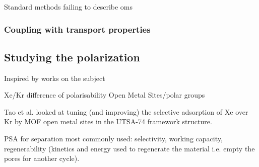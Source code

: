\documentclass[main]{subfiles}
\begin{document}
Standard methods failing to describe oms\autocite{Perry_2014} 


\subsubsection{Coupling with transport properties}


\subsection{Studying the polarization}

Inspired by works on the subject\autocite{Lachet_1998,Becker_2017} 


Xe/Kr difference of polarisability
Open Metal Sites/polar groups

Tao et al.\autocite{Tao_2020} looked at tuning (and improving) the selective adsorption of Xe over Kr by MOF open metal sites in the UTSA-74 framework structure.



PSA for separation most commonly used: selectivity, working capacity, regenerability (kinetics and energy used to regenerate the material i.e. empty the pores for another cycle).\autocite{Kumar_1994}

\OnlyInSubfile{\printglobalbibliography}
\end{document}
